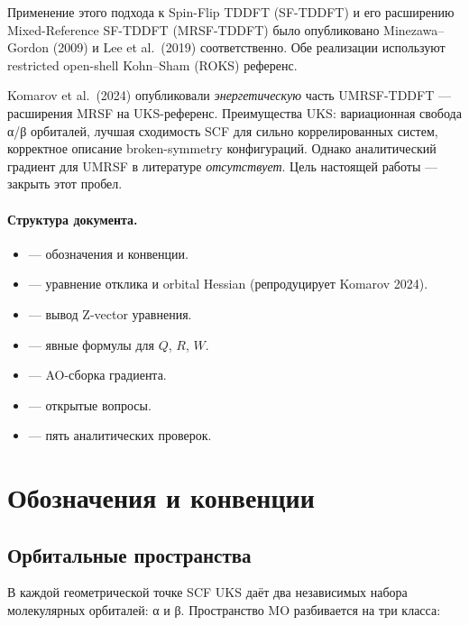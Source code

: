 \documentclass[11pt, a4paper]{article}
\theoremstyle{definition}
\begin{document}
Применение этого подхода к Spin-Flip TDDFT (SF-TDDFT) и его расширению Mixed-Reference SF-TDDFT (MRSF-TDDFT) было опубликовано Minezawa--Gordon (2009) и Lee et al.\ (2019) соответственно. Обе реализации используют restricted open-shell Kohn--Sham (ROKS) референс.

Komarov et al.\ (2024) опубликовали \emph{энергетическую} часть UMRSF-TDDFT --- расширения MRSF на UKS-референс. Преимущества UKS: вариационная свобода α/β орбиталей, лучшая сходимость SCF для сильно коррелированных систем, корректное описание broken-symmetry конфигураций. Однако аналитический градиент для UMRSF в литературе \emph{отсутствует}. Цель настоящей работы --- закрыть этот пробел.

\paragraph{Структура документа.}
\begin{itemize}
    \item {} --- обозначения и конвенции.
    \item {} --- уравнение отклика и orbital Hessian (репродуцирует Komarov 2024).
    \item {} --- вывод Z-vector уравнения.
    \item {} --- явные формулы для $Q$, $R$, $W$.
    \item {} --- AO-сборка градиента.
    \item {} --- открытые вопросы.
    \item {} --- пять аналитических проверок.
\end{itemize}

\section{Обозначения и конвенции}
\label{sec:notation}

\subsection{Орбитальные пространства}

В каждой геометрической точке SCF UKS даёт два независимых набора молекулярных орбиталей: α и β. Пространство MO разбивается на три класса:
\end{document}
